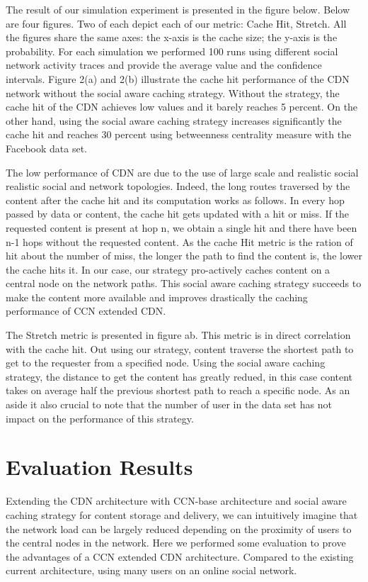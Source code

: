 The result of our simulation experiment is presented in the figure below. Below are four figures. Two of each depict each of our metric: Cache Hit, Stretch. All the figures share the same axes: the x-axis is the cache size; the y-axis is the probability. For each simulation we performed 100 runs using different social network activity traces and provide the average value and the confidence intervals. 
Figure 2(a) and 2(b) illustrate the cache hit performance of the CDN network without the social aware caching strategy. Without the strategy, the cache hit of the CDN achieves low values and it barely reaches 5 percent. On the other hand, using the social aware caching strategy increases significantly the cache hit and reaches 30 percent using betweenness centrality measure with the Facebook data set. 

The low performance of CDN are due to the use of large scale and realistic social realistic social and network topologies. Indeed, the long routes traversed by the content after the cache hit and its computation works as follows. In every hop passed by data or content, the cache hit gets updated with a hit or miss. If the requested content is present at hop n, we obtain a single hit and there have been n-1 hops without the requested content. As the cache Hit metric is the ration of hit about the number of miss, the longer the path to find the content is, the lower the cache hits it. In our case, our strategy pro-actively caches content on a central node on the network paths. This social aware caching strategy succeeds to make the content more available and improves drastically the caching performance of CCN extended CDN.

The Stretch metric is presented in figure ab. This metric is in direct correlation with the cache hit. Out using our strategy, content traverse the shortest path to get to the requester from a specified node. Using the social aware caching strategy, the distance to get the content has greatly redued, in this case content takes on average half the previous shortest path to reach a specific node. As an aside it also crucial to note that the number of user in the data set has not impact on the performance of this strategy. 


\section{Evaluation Results}

Extending the CDN architecture with CCN-base architecture and social aware caching strategy for content storage and delivery, we can intuitively imagine that the network load can be largely reduced depending on the proximity of users to the central nodes in the network. Here we performed some evaluation to prove the advantages of a CCN extended CDN architecture. Compared to the existing current architecture, using many users on an online social network.

